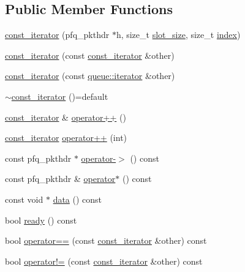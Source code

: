 \subsection*{Public Member Functions}
\begin{DoxyCompactItemize}
\item 
\hyperlink{structpfq_1_1queue_1_1const__iterator_aa9ace7c83c3f43ab8e41b522368452c5}{const\+\_\+iterator} (pfq\+\_\+pkthdr $\ast$h, size\+\_\+t \hyperlink{classpfq_1_1queue_aa8ec2b1bd7c4fb2ec924f356c95b81ae}{slot\+\_\+size}, size\+\_\+t \hyperlink{classpfq_1_1queue_a6eec9332ce5248055b03376855469087}{index})
\item 
\hyperlink{structpfq_1_1queue_1_1const__iterator_a528fc5b186cec7b4acfb75e4a069636c}{const\+\_\+iterator} (const \hyperlink{structpfq_1_1queue_1_1const__iterator}{const\+\_\+iterator} \&other)
\item 
\hyperlink{structpfq_1_1queue_1_1const__iterator_a9abd37c031eece3084e6944a7497400e}{const\+\_\+iterator} (const \hyperlink{structpfq_1_1queue_1_1iterator}{queue\+::iterator} \&other)
\item 
\hyperlink{structpfq_1_1queue_1_1const__iterator_abc154cce287fdda2b0ed2a9f19f422c1}{$\sim$const\+\_\+iterator} ()=default
\item 
\hyperlink{structpfq_1_1queue_1_1const__iterator}{const\+\_\+iterator} \& \hyperlink{structpfq_1_1queue_1_1const__iterator_aa05ff7c6c62b9c00aff7fbf378349d4e}{operator++} ()
\item 
\hyperlink{structpfq_1_1queue_1_1const__iterator}{const\+\_\+iterator} \hyperlink{structpfq_1_1queue_1_1const__iterator_a50c3feb1c536c69d012de542c3421ec0}{operator++} (int)
\item 
const pfq\+\_\+pkthdr $\ast$ \hyperlink{structpfq_1_1queue_1_1const__iterator_a054acc5d8bd0bb6b0bfe493573c0a2f2}{operator-\/$>$} () const 
\item 
const pfq\+\_\+pkthdr \& \hyperlink{structpfq_1_1queue_1_1const__iterator_a96e74f6069c3001c222e27415b0ce5b0}{operator$\ast$} () const 
\item 
const void $\ast$ \hyperlink{structpfq_1_1queue_1_1const__iterator_afb47353c9138edad3c06eaee51bbb73e}{data} () const 
\item 
bool \hyperlink{structpfq_1_1queue_1_1const__iterator_a04ad2278401bc8134b8e94f7d39f6ae5}{ready} () const 
\item 
bool \hyperlink{structpfq_1_1queue_1_1const__iterator_a4b11f63ae3aaef3585db163a6226bebd}{operator==} (const \hyperlink{structpfq_1_1queue_1_1const__iterator}{const\+\_\+iterator} \&other) const 
\item 
bool \hyperlink{structpfq_1_1queue_1_1const__iterator_a2d14a9e03bb2dc0bf559a9fa0040a7a2}{operator!=} (const \hyperlink{structpfq_1_1queue_1_1const__iterator}{const\+\_\+iterator} \&other) const 
\end{DoxyCompactItemize}


